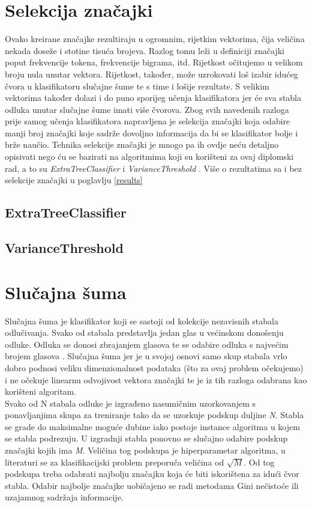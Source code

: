 \section{Selekcija značajki}
Ovako kreirane značajke rezultiraju u ogromnim, rijetkim vektorima, čija veličina nekada doseže i stotine tisuća brojeva. Razlog tomu leži u definiciji značajki poput frekvencije tokena, frekvencije bigrama, itd. Rijetkost očitujemo u velikom broju nula unutar vektora. Rijetkost, također,  može uzrokovati loš izabir idućeg čvora u klasifikatoru slučajne šume te s time i lošije rezultate. S velikim vektorima također dolazi i do puno sporijeg učenja klasifikatora jer će sva stabla odluka unutar slučajne šume imati više čvorova. Zbog svih navedenih razloga prije samog učenja klasifikatora napravljena je selekcija značajki koja odabire manji broj značajki koje sadrže dovoljno informacija da bi se klasifikator bolje i brže naučio. Tehnika selekcije značajki je mnogo pa ih ovdje neću detaljno opisivati nego ću se bazirati na algoritmima koji su korišteni za ovaj diplomski rad, a to su \textit{ExtraTreeClassifier} \cite{extratree} i \textit{VarianceThreshold} \cite{variance}. Više o rezultatima sa i bez selekcije značajki u poglavlju \ref{results}

\subsection{ExtraTreeClassifier}

\subsection{VarianceThreshold}

\section{Slučajna šuma}

Slučajna šuma je klasifikator koji se sastoji od kolekcije nezavisnih stabala odlučivanja. Svako od stabala predstavlja jedan glas u većinskom donošenju odluke. Odluka se donosi zbrajanjem glasova te se odabire odluka s najvećim brojem glasova \cite{rfdef}. Slučajna šuma jer je u svojoj osnovi samo skup stabala vrlo dobro podnosi veliku dimenzionalnost podataka (što za ovaj problem očekujemo) i ne očekuje linearnu odvojivost vektora značajki te je iz tih razloga odabrana kao korišteni algoritam.  \\
	
	Svako od N stabala odluke je izgrađeno nasumičnim uzorkovanjem s ponavljanjima skupa za treniranje tako da se uzorkuje podskup duljine \textit{N}. Stabla se grade do maksimalne moguće dubine iako postoje instance algoritma u kojem se stabla podrezuju. U izgradnji stabla ponovno se slučajno odabire podskup značajki kojih ima \textit{M}. Veličina tog podskupa je hiperparametar algoritma, u literaturi \cite{statisticallearning} se za klasifikacijski problem preporuča veličina od $\sqrt{M}$. Od tog podskupa treba odabrati najbolju značajku koja će biti iskorištena za idući čvor stabla. Odabir najbolje značajke uobičajeno se radi metodama Gini nečistoće ili uzajamnog sadržaja informacije.
	
